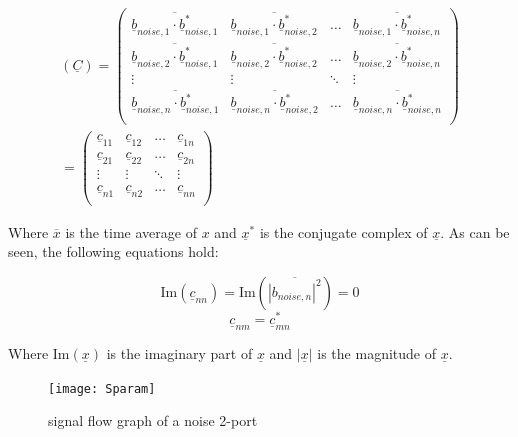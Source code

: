 \documentclass[10pt]{report}
\begin{document}
\begin{equation}
\begin{split}
(\underline{C}) =
\begin{pmatrix}
 \overline{\underline{b}_{noise,1}\cdot \underline{b}_{noise,1}^*} &
    \overline{\underline{b}_{noise,1}\cdot \underline{b}_{noise,2}^*} &
    \ldots & \overline{\underline{b}_{noise,1}\cdot \underline{b}_{noise,n}^*}\\
 \overline{\underline{b}_{noise,2}\cdot \underline{b}_{noise,1}^*} &
    \overline{\underline{b}_{noise,2}\cdot \underline{b}_{noise,2}^*} & \ldots &
    \overline{\underline{b}_{noise,2}\cdot \underline{b}_{noise,n}^*}\\
 \vdots & \vdots & \ddots & \vdots\\
 \overline{\underline{b}_{noise,n}\cdot \underline{b}_{noise,1}^*} &
    \overline{\underline{b}_{noise,n}\cdot \underline{b}_{noise,2}^*} &
    \ldots & \overline{\underline{b}_{noise,n}\cdot \underline{b}_{noise,n}^*}\\
\end{pmatrix}
\\ =
\begin{pmatrix}
  \underline{c}_{11} & \underline{c}_{12} & \ldots & \underline{c}_{1n}\\
  \underline{c}_{21} & \underline{c}_{22} & \ldots & \underline{c}_{2n}\\
  \vdots & \vdots & \ddots & \vdots\\
  \underline{c}_{n1} & \underline{c}_{n2} & \ldots & \underline{c}_{nn}\\
\end{pmatrix}
\end{split}
\end{equation}

Where $\overline{x}$ is the time average of $x$ and $\underline{x}^*$
is the conjugate complex of $\underline{x}$.  As can be seen, the
following equations hold:

\begin{equation}
\text{Im}(\underline{c}_{nn}) = \text{Im}(\overline{|b_{noise,n}|^2}) = 0
\end{equation}
\begin{equation}
\underline{c}_{nm} = \underline{c}_{mn}^*
\end{equation}

Where $\text{Im}(\underline{x})$ is the imaginary part of
$\underline{x}$ and $|\underline{x}|$ is the magnitude of
$\underline{x}$.

\begin{figure}[ht]
\begin{center}
\texttt{[image: Sparam]}
\end{center}
\caption{signal flow graph of a noise 2-port}
\label{fig:Sparam}
\end{figure}
\FloatBarrier
\end{document}
